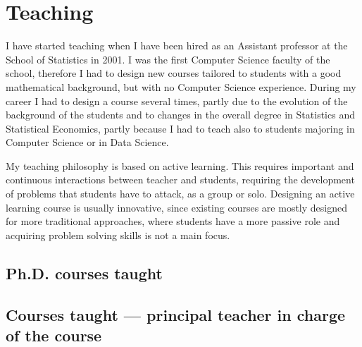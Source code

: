 \documentclass[11pt,a4paper,roman]{moderncv}
\begin{document}
\section{Teaching}

I have started teaching when I have been hired as an Assistant professor at
  the School of Statistics in 2001.
  I was the first Computer Science faculty of the school, therefore I had to
  design new courses tailored to students with a good mathematical background,
  but with no Computer Science experience.
  During my career I had to design a course several times, partly due to the
  evolution of the background of the students and to changes in the overall
  degree in Statistics and Statistical Economics, partly because I had to teach
  also to students majoring in Computer Science or in Data Science.

  My teaching philosophy is based on active learning. This requires important
  and continuous interactions between teacher and students, requiring the
  development of problems that students have to attack, as a group or solo.
  Designing an active learning course is usually innovative, since existing
  courses are mostly designed for more traditional approaches, where students
  have a more passive role and acquiring problem solving skills is not a main focus.

  \subsection{Ph.D. courses taught}




\subsection{Courses taught --- principal teacher in charge of the
course}


\end{document}
